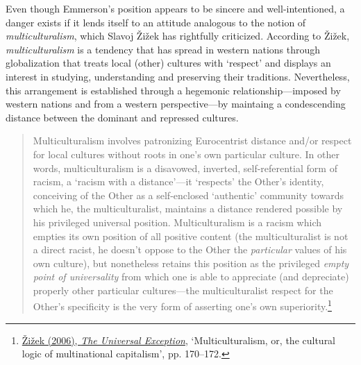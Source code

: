 \hypertarget{multiculturalism}{}
Even though Emmerson's position appears to be sincere and well-intentioned, a danger exists if it lends itself to an attitude analogous to the notion of \emph{multiculturalism}, which Slavoj \v{Z}i\v{z}ek has rightfully criticized. According to \v{Z}i\v{z}ek, \emph{multiculturalism} is a tendency that has spread in western nations through globalization that treats local (other) cultures with `respect' and displays an interest in studying, understanding and preserving their traditions. Nevertheless, this arrangement is established through a hegemonic relationship---imposed by western nations and from a western perspective---by maintaing a condescending distance between the dominant and repressed cultures.
\begin{quote}
Multiculturalism involves patronizing Eurocentrist distance and/or respect for local cultures without roots in one's own particular culture. In other words, multiculturalism is a disavowed, inverted, self-referential form of racism, a `racism with a distance'---it `respects' the Other's identity, conceiving of the Other as a self-enclosed `authentic' community towards which he, the multiculturalist, maintains a distance rendered possible by his privileged universal position. Multiculturalism is a racism which empties its own position of all positive content (the multiculturalist is not a direct racist, he doesn't oppose to the Other the \emph{particular} values of his own culture), but nonetheless retains this position as the privileged \emph{empty point of universality} from which one is able to appreciate (and depreciate) properly other particular cultures---the multiculturalist respect for the Other's specificity is the very form of asserting one's own superiority.\footnote{\hyperlink{zizekuniv}{\v{Z}i\v{z}ek (2006), \emph{The Universal Exception}}, `Multiculturalism, or, the cultural logic of multinational capitalism', pp. 170--172.}
\end{quote}

